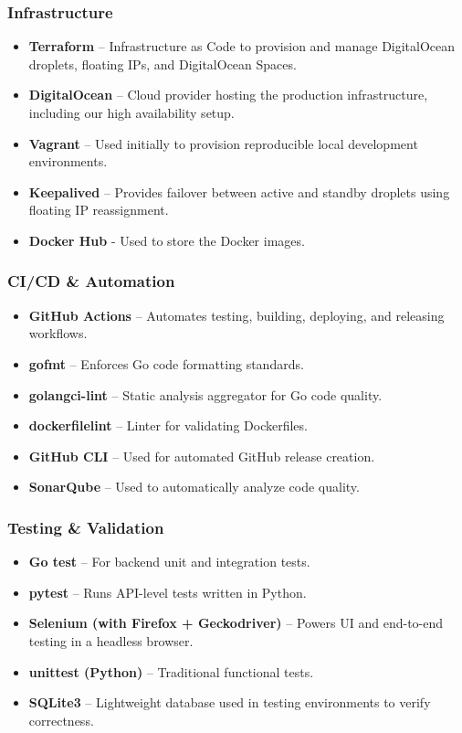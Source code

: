 \subsubsection*{Infrastructure}
\begin{itemize}
  \item \textbf{Terraform} – Infrastructure as Code to provision and manage DigitalOcean droplets, floating IPs, and DigitalOcean Spaces.
  \item \textbf{DigitalOcean} – Cloud provider hosting the production infrastructure, including our high availability setup.
  \item \textbf{Vagrant} – Used initially to provision reproducible local development environments.
  \item \textbf{Keepalived} – Provides failover between active and standby droplets using floating IP reassignment.
  \item \textbf{Docker Hub} - Used to store the Docker images.
\end{itemize}

\subsubsection*{CI/CD \& Automation}
\begin{itemize}
  \item \textbf{GitHub Actions} – Automates testing, building, deploying, and releasing workflows.
  \item \textbf{gofmt} – Enforces Go code formatting standards.
  \item \textbf{golangci-lint} – Static analysis aggregator for Go code quality.
  \item \textbf{dockerfilelint} – Linter for validating Dockerfiles.
  \item \textbf{GitHub CLI} – Used for automated GitHub release creation. 
  \item \textbf{SonarQube} – Used to automatically analyze code quality.
\end{itemize}

\subsubsection*{Testing \& Validation}
\begin{itemize}
  \item \textbf{Go test} – For backend unit and integration tests.
  \item \textbf{pytest} – Runs API-level tests written in Python.
  \item \textbf{Selenium (with Firefox + Geckodriver)} – Powers UI and end-to-end testing in a headless browser.
  \item \textbf{unittest (Python)} – Traditional functional tests.
  \item \textbf{SQLite3} – Lightweight database used in testing environments to verify correctness.
\end{itemize}

